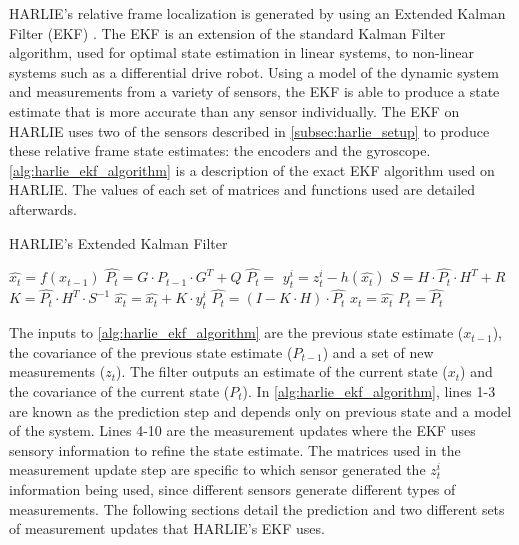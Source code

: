 HARLIE's relative frame localization is generated by using an Extended Kalman Filter (EKF) \autocites{Larsen1999}{Welch95anintroduction}{ProbRobotics}. The EKF is an extension of the standard Kalman Filter algorithm, used for optimal state estimation in linear systems, to non-linear systems such as a differential drive robot. Using a model of the dynamic system and measurements from a variety of sensors, the EKF is able to produce a state estimate that is more accurate than any sensor individually. The EKF on HARLIE uses two of the sensors described in \autoref{subsec:harlie_setup} to produce these relative frame state estimates: the encoders and the gyroscope. \autoref{alg:harlie_ekf_algorithm} is a description of the exact EKF algorithm used on HARLIE. The values of each set of matrices and functions used are detailed afterwards.

\begin{algorithm}
\caption{HARLIE's Extended Kalman Filter}
\label{alg:harlie_ekf_algorithm}
\DontPrintSemicolon
{}


$\hat{x_t} = f(x_{t-1})$\;
$\hat{P_t} = G \cdot P_{t-1} \cdot G^T + Q$\;
$\hat{P_t} = $ \;
{
	$y^i_t = z^i_t - h(\hat{x_t})$\;
	$S = H \cdot \hat{P_t} \cdot H^T + R$\;
	$K = \hat{P_t} \cdot H^T \cdot S^{-1}$\;
	$\hat{x_t} = \hat{x_t} + K \cdot y^i_t$\;
	$\hat{P_t} = \left(I - K \cdot H \right) \cdot \hat{P_t}$\;
}
$x_t = \hat{x_t}$\;
$P_t = \hat{P_t}$\;
\end{algorithm}

The inputs to \autoref{alg:harlie_ekf_algorithm} are the previous state estimate ($x_{t-1}$), the covariance of the previous state estimate ($P_{t-1}$) and a set of new measurements ($z_t$). The filter outputs an estimate of the current state ($x_t$) and the covariance of the current state ($P_t$). In \autoref{alg:harlie_ekf_algorithm}, lines 1-3 are known as the prediction step and depends only on previous state and a model of the system. Lines 4-10 are the measurement updates where the EKF uses sensory information to refine the state estimate. The matrices used in the measurement update step are specific to which sensor generated the $z^i_t$ information being used, since different sensors generate different types of measurements. The following sections detail the prediction and two different sets of measurement updates that HARLIE's EKF uses.

